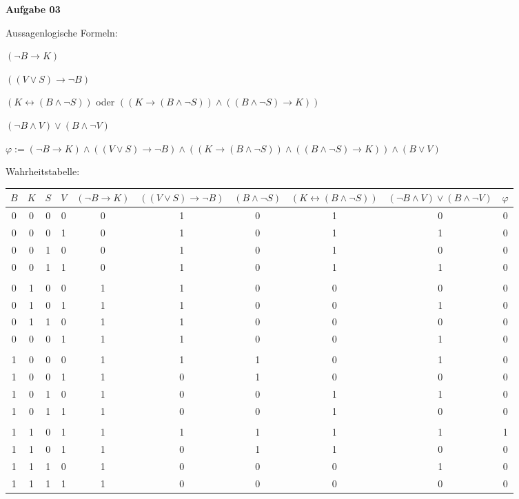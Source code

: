 \documentclass[a4paper,10pt]{article}
\begin{document}
	\textbf{Aufgabe 03}
	\begin{compactenum}[(a)]
		\item Aussagenlogische Formeln:
		\begin{compactenum}[I:]
			\item $(\lnot B \rightarrow K)$
			\item $((V \vee S) \rightarrow \lnot B)$
			\item $(K \leftrightarrow (B \wedge \lnot S))$ oder $((K \rightarrow (B \wedge \lnot S)) \wedge ((B \wedge \lnot S) \rightarrow K))$
			\item $(\lnot B \wedge V) \vee (B \wedge \lnot V)$
		\end{compactenum}
		\item $\varphi:= (\lnot B \rightarrow K) \wedge ((V \vee S) \rightarrow \lnot B) \wedge ((K \rightarrow (B \wedge \lnot S)) \wedge ((B \wedge \lnot S) \rightarrow K)) \wedge (B \vee V)$

		\item Wahrheitstabelle: \\
		\begin{tabular}{c|c|c|c|c|c|c|c|c|c}
			$B$ & $K$ & $S$ & $V$ & $(\lnot B \rightarrow K)$ & $((V \vee S) \rightarrow \lnot B)$ & $(B \wedge \lnot S)$ & $(K \leftrightarrow (B \wedge \lnot S))$ & $(\lnot B \wedge V) \vee (B \wedge \lnot V)$ & $\varphi$ \\ \hline
			0 & 0 & 0 & 0 & 0 & 1 & 0 & 1 & 0 & 0\\
			0 & 0 & 0 & 1 & 0 & 1 & 0 & 1 & 1 & 0\\
			0 & 0 & 1 & 0 & 0 & 1 & 0 & 1 & 0 & 0\\
			0 & 0 & 1 & 1 & 0 & 1 & 0 & 1 & 1 & 0\\
			&&&&&&&&& \\
			0 & 1 & 0 & 0 & 1 & 1 & 0 & 0 & 0 & 0\\
			0 & 1 & 0 & 1 & 1 & 1 & 0 & 0 & 1 & 0\\
			0 & 1 & 1 & 0 & 1 & 1 & 0 & 0 & 0 & 0\\
			0 & 0 & 0 & 1 & 1 & 1 & 0 & 0 & 1 & 0\\
			&&&&&&&&& \\
			1 & 0 & 0 & 0 & 1 & 1 & 1 & 0 & 1 & 0\\
			1 & 0 & 0 & 1 & 1 & 0 & 1 & 0 & 0 & 0\\
			1 & 0 & 1 & 0 & 1 & 0 & 0 & 1 & 1 & 0\\
			1 & 0 & 1 & 1 & 1 & 0 & 0 & 1 & 0 & 0\\
			&&&&&&&&& \\
			\rowcolor{lightgray}1 & 1 & 0 & 1 & 1 & 1 & 1 & 1 & 1 & 1\\
			1 & 1 & 0 & 1 & 1 & 0 & 1 & 1 & 0 & 0\\
			1 & 1 & 1 & 0 & 1 & 0 & 0 & 0 & 1 & 0\\
			1 & 1 & 1 & 1 & 1 & 0 & 0 & 0 & 0 & 0\\
		\end{tabular} \ \\


\end{compactenum}
\end{document}
